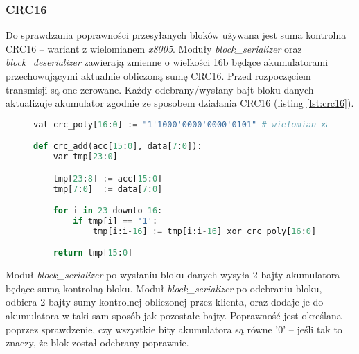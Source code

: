 \subsubsection{CRC16}
\label{sec:crc16}
Do sprawdzania poprawności przesyłanych bloków używana jest suma kontrolna CRC16 -- wariant z wielomianem \textit{x8005}. Moduły \textit{block\_serializer} oraz \textit{block\_deserializer} zawierają zmienne o wielkości 16b będące akumulatorami przechowującymi aktualnie obliczoną sumę CRC16. Przed rozpoczęciem transmisji są one zerowane. Każdy odebrany/wysłany bajt bloku danych aktualizuje akumulator zgodnie ze sposobem działania CRC16 (listing \ref{lst:crc16}). 

\begin{figure}[!h]
\begin{lstlisting}[language=Python, basicstyle=\ttfamily, autogobble=true, tabsize=3, morekeywords={downto, val, var}, captionpos=b, caption={Algorytm dodawania bajtu do akumulatora sumy kontrolnej CRC16}, label={lst:crc16}]
val crc_poly[16:0] := "1'1000'0000'0000'0101" # wielomian x8005

def crc_add(acc[15:0], data[7:0]):
	var tmp[23:0]

	tmp[23:8] := acc[15:0]
	tmp[7:0]  := data[7:0]

	for i in 23 downto 16:
		if tmp[i] == '1':
			tmp[i:i-16] := tmp[i:i-16] xor crc_poly[16:0]

	return tmp[15:0]
\end{lstlisting}
\end{figure}

Moduł \textit{block\_serializer} po wysłaniu bloku danych wysyła 2 bajty akumulatora będące sumą kontrolną bloku. Moduł \textit{block\_serializer} po odebraniu bloku, odbiera 2 bajty sumy kontrolnej obliczonej przez klienta, oraz dodaje je do akumulatora w taki sam sposób jak pozostałe bajty. Poprawność jest określana poprzez sprawdzenie, czy wszystkie bity akumulatora są równe {'0'} -- jeśli tak to znaczy, że blok został odebrany poprawnie.